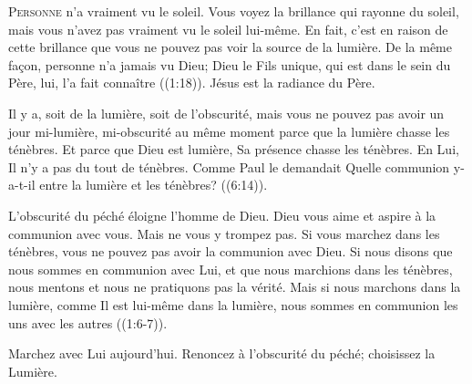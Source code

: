 \dvrule






\lettrine{P}{ersonne} n'a vraiment vu le soleil. Vous voyez la brillance
 qui rayonne du soleil, mais vous n'avez pas vraiment vu le soleil lui-même.
 En fait, c'est en raison de cette brillance que vous ne pouvez pas voir
 la source de la lumière. De la même fa\c{c}on,
 \Og personne 
 n'a jamais vu Dieu; Dieu le Fils unique, qui est dans le sein du Père, lui,
 l'a fait connaître \Fg{} ((1:18)).
 Jésus est la radiance du Père.


Il y a, soit de la lumière, soit de l'obscurité, mais vous ne pouvez pas
 avoir un jour mi-lumière, mi-obscurité au même moment parce que la lumière
 chasse les ténèbres. Et parce que Dieu est lumière, Sa présence chasse
 les ténèbres. En Lui, Il n'y a pas du tout de ténèbres.
 Comme Paul le demandait\frcolon{} 
 \Og Quelle communion y-a-t-il entre la lumière et les ténèbres? \Fg{}
 ((6:14)).

L'obscurité du péché éloigne l'homme de Dieu. Dieu vous aime et aspire
 à la communion avec vous. Mais ne vous y trompez pas.
 Si vous marchez dans les ténèbres, vous ne pouvez pas avoir
 la communion avec Dieu.
 \Og Si nous disons que nous sommes en communion avec Lui,
 et que nous marchions dans les ténèbres, nous mentons et nous ne pratiquons
 pas la vérité. Mais si nous marchons dans la lumière,
 comme Il est lui-même dans la lumière, nous sommes en communion
 les uns avec les autres \Fg{} ((1:6-7)).

Marchez avec Lui aujourd'hui. Renoncez à l'obscurité du péché;
 choisissez la Lumière.


\dvrule


